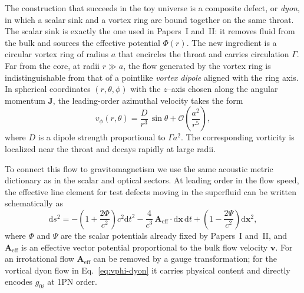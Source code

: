 \documentclass[11pt]{article}
\newcommand{\dd}{\mathrm{d}}
\begin{document}
The construction that succeeds in the toy universe is a composite
defect, or \emph{dyon}, in which a scalar sink and a vortex ring are
bound together on the same throat.
The scalar sink is exactly the one used in Papers~I and~II: it
removes fluid from the bulk and sources the effective potential
$\Phi(r)$.
The new ingredient is a circular vortex ring of radius $a$ that
encircles the throat and carries circulation $\Gamma$.
Far from the core, at radii $r \gg a$, the flow generated by the
vortex ring is indistinguishable from that of a pointlike \emph{vortex
dipole} aligned with the ring axis.
In spherical coordinates $(r,\theta,\phi)$ with the $z$–axis chosen
along the angular momentum $\mathbf{J}$, the leading-order azimuthal
velocity takes the form
\begin{equation}
  v_\phi(r,\theta)
  = \frac{D}{r^3}\,\sin\theta
  + \mathcal{O}\!\left(\frac{a^2}{r^5}\right),
  \label{eq:vphi-dyon}
\end{equation}
where $D$ is a dipole strength proportional to $\Gamma a^2$.
The corresponding vorticity is localized near the throat and decays
rapidly at large radii.

To connect this flow to gravitomagnetism we use the same acoustic
metric dictionary as in the scalar and optical sectors.
At leading order in the flow speed, the effective line element for
test defects moving in the superfluid can be written schematically as
\begin{equation}
  \dd s^2
  = -\left(1 + \frac{2\Phi}{c^2}\right)c^2 \dd t^2
    - \frac{4}{c^3}\,\mathbf{A}_{\text{eff}}\cdot\dd\mathbf{x}\,\dd t
    + \left(1 - \frac{2\Psi}{c^2}\right)\dd\mathbf{x}^2,
  \label{eq:acoustic-metric}
\end{equation}
where $\Phi$ and $\Psi$ are the scalar potentials already fixed by
Papers~I and~II, and $\mathbf{A}_{\text{eff}}$ is an effective vector
potential proportional to the bulk flow velocity $\mathbf{v}$.
For an irrotational flow $\mathbf{A}_{\text{eff}}$ can be removed by
a gauge transformation; for the vortical dyon flow in
Eq.~\eqref{eq:vphi-dyon} it carries physical content and directly
encodes $g_{0i}$ at 1PN order.
\end{document}
